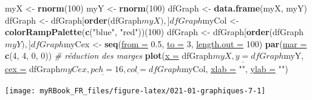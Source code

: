 \documentclass[twoside,symmetric]{book}
\newenvironment{Shaded}{}{}
\newcommand{\CommentTok}[1]{\textit{#1}}
\newcommand{\DataTypeTok}[1]{\underline{#1}}
\newcommand{\DecValTok}[1]{#1}
\newcommand{\FloatTok}[1]{#1}
\newcommand{\KeywordTok}[1]{\textbf{#1}}
\newcommand{\NormalTok}[1]{#1}
\newcommand{\OperatorTok}[1]{#1}
\newcommand{\StringTok}[1]{#1}
\begin{document}
\begin{Shaded}
\begin{Highlighting}[]
\NormalTok{myX <-}\StringTok{ }\KeywordTok{rnorm}\NormalTok{(}\DecValTok{100}\NormalTok{)}
\NormalTok{myY <-}\StringTok{ }\KeywordTok{rnorm}\NormalTok{(}\DecValTok{100}\NormalTok{)}
\NormalTok{dfGraph <-}\StringTok{ }\KeywordTok{data.frame}\NormalTok{(myX, myY)}
\NormalTok{dfGraph <-}\StringTok{ }\NormalTok{dfGraph[}\KeywordTok{order}\NormalTok{(dfGraph}\OperatorTok{$}\NormalTok{myX),]}
\NormalTok{dfGraph}\OperatorTok{$}\NormalTok{myCol <-}\StringTok{ }\KeywordTok{colorRampPalette}\NormalTok{(}\KeywordTok{c}\NormalTok{(}\StringTok{"blue"}\NormalTok{, }\StringTok{"red"}\NormalTok{))(}\DecValTok{100}\NormalTok{)}
\NormalTok{dfGraph <-}\StringTok{ }\NormalTok{dfGraph[}\KeywordTok{order}\NormalTok{(dfGraph}\OperatorTok{$}\NormalTok{myY),]}
\NormalTok{dfGraph}\OperatorTok{$}\NormalTok{myCex <-}\StringTok{ }\KeywordTok{seq}\NormalTok{(}\DataTypeTok{from =} \FloatTok{0.5}\NormalTok{, }\DataTypeTok{to =} \DecValTok{3}\NormalTok{, }\DataTypeTok{length.out =} \DecValTok{100}\NormalTok{)}
\KeywordTok{par}\NormalTok{(}\DataTypeTok{mar =} \KeywordTok{c}\NormalTok{(}\DecValTok{4}\NormalTok{, }\DecValTok{4}\NormalTok{, }\DecValTok{0}\NormalTok{, }\DecValTok{0}\NormalTok{)) }\CommentTok{# réduction des marges}
\KeywordTok{plot}\NormalTok{(}\DataTypeTok{x =}\NormalTok{ dfGraph}\OperatorTok{$}\NormalTok{myX, }\DataTypeTok{y =}\NormalTok{ dfGraph}\OperatorTok{$}\NormalTok{myY, }
  \DataTypeTok{cex =}\NormalTok{ dfGraph}\OperatorTok{$}\NormalTok{myCex, }\DataTypeTok{pch =} \DecValTok{16}\NormalTok{, }\DataTypeTok{col =}\NormalTok{ dfGraph}\OperatorTok{$}\NormalTok{myCol, }
  \DataTypeTok{xlab =} \StringTok{""}\NormalTok{, }\DataTypeTok{ylab =} \StringTok{""}\NormalTok{)}
\end{Highlighting}
\end{Shaded}

\texttt{[image: myRBook\_FR\_files/figure-latex/021-01-graphiques-7-1]}
\end{document}
